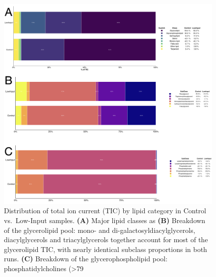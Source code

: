 \documentclass[10pt,letterpaper]{article}
\begin{document}
\begin{figure}[htp]
  \centering
  \includegraphics[width=\textwidth]{fig/supp/SuppFig5.png}
  \caption{
    Distribution of total ion current (TIC) by lipid category in Control vs.\ Low-Input samples. 
    {\bf(A)} Major lipid classes as %
    {\bf(B)} Breakdown of the glycerolipid pool: mono- and di-galactosyldiacylglycerols, diacylglycerols and triacylglycerols together account for most of the glycerolipid TIC, with nearly identical subclass proportions in both runs. 
    {\bf(C)} Breakdown of the glycerophospholipid pool: phosphatidylcholines (>79 %
  }
  \label{fig:S5}
\end{figure}
\end{document}
